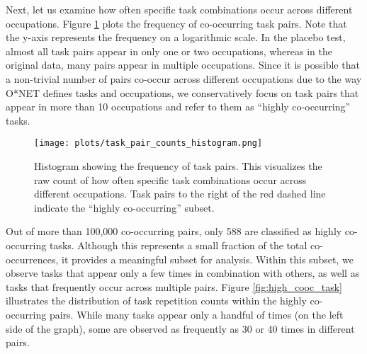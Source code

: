 \documentclass{article}
\theoremstyle{plain}
\theoremstyle{plain}
\begin{document}


Next, let us examine how often specific task combinations occur across different occupations. 
Figure \ref{fig:pair_counts} plots the frequency of co-occurring task pairs. 
Note that the y-axis represents the frequency on a logarithmic scale. 
In the placebo test, almost all task pairs appear in only one or two occupations, whereas in the original data, many pairs appear in multiple occupations. 
Since it is possible that a non-trivial number of pairs co-occur across different occupations due to the way O*NET defines tasks and occupations, we conservatively focus on task pairs that appear in more than 10 occupations and refer to them as “highly co-occurring” tasks.

\begin{figure}[htbp]
  \centering
  \texttt{[image: plots/task\_pair\_counts\_histogram.png]}
  \caption{Histogram showing the frequency of task pairs. This visualizes the raw count of how often specific task combinations occur across different occupations. Task pairs to the right of the red dashed line indicate the “highly co-occurring” subset.}
  \label{fig:pair_counts}
\end{figure}

Out of more than 100,000 co-occurring pairs, only 588 are classified as highly co-occurring tasks. 
Although this represents a small fraction of the total co-occurrences, it provides a meaningful subset for analysis.
Within this subset, we observe tasks that appear only a few times in combination with others, as well as tasks that frequently occur across multiple pairs. 
Figure \ref{fig:high_cooc_task} illustrates the distribution of task repetition counts within the highly co-occurring pairs. 
While many tasks appear only a handful of times (on the left side of the graph), some are observed as frequently as 30 or 40 times in different pairs.
\end{document}
